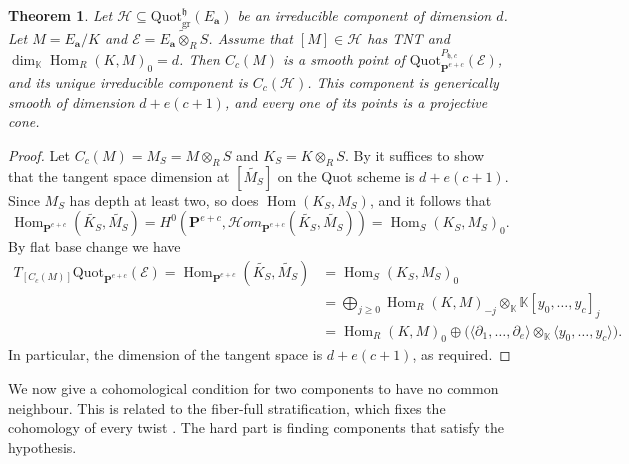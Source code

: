 \documentclass[leqno,11pt,a4paper]{amsart}
\newtheorem{thm}{Theorem}[section]
\theoremstyle{definition}
\numberwithin{equation}{section}
\newcommand{\kk}{\mathbb{K}}
\newcommand{\bfa}{\mathbf{a}}
\newcommand{\Quot}{\mathrm{Quot}}
\newcommand{\PP}{\mathbf{P}}
\newcommand{\mfh}{\mathfrak{h}}
\newcommand{\EE}{\mathscr{E}}
\newcommand{\HH}{\mathcal{H}}
\DeclareMathOperator{\Hom}{Hom}
\begin{document}
\begin{thm} \label{module_conet}
Let $\HH\subseteq\Quot^{\mfh}_{\mathrm{gr}}(E_\bfa)$ be an irreducible component of dimension $d$. 
Let $M = E_\bfa/K$ and $\EE = \widetilde{E_\bfa \otimes_R S}$.
Assume that $[M] \in\HH$ has TNT and $\dim_\kk\Hom_R(K,M)_0=d$. 
Then $C_c(M)$ is a smooth point of $\Quot^{P_{\mfh,c}}_{\PP^{e+c}}(\EE)$, and its unique irreducible component is $C_c(\HH)$. 
This component is generically smooth of dimension $d+e(c+1)$, and every one of its points is a projective cone.
\end{thm}

\begin{proof}
Let $C_c(M) = M_S = M \otimes_R S$ and $K_S = K \otimes_R S$.
By  it suffices to show that the tangent space dimension at $[\widetilde{M_S}]$ on the Quot scheme is $d+e(c+1)$.
Since $M_S$ has depth at least two, so does $\Hom(K_S,M_S)$, and it follows that 
$$
\Hom_{\PP^{e+c}}(\widetilde{K_S},\widetilde{M_S}) =  H^0(\PP^{e+c},\mathcal{H}om_{\PP^{e+c}}(\widetilde{K_S},\widetilde{M_S})) = \Hom_S(K_S,M_S)_0.
$$
By flat base change we have 
$$
\begin{aligned}
T_{[C_c(M)]}\Quot_{\PP^{e+c}}(\EE)  = \Hom_{\PP^{e+c}}(\widetilde{K_S},\widetilde{M_S}) & =\Hom_S(K_S,M_S)_0\\
&=\bigoplus_{j\geq0} \Hom_R(K,M)_{-j}
                 \otimes_\kk\kk[y_0,\ldots,y_c]_j\\
&=\Hom_R(K,M)_0 \oplus
  \bigl(\langle \partial_1,\ldots,\partial_e \rangle
                  \otimes_\kk \langle y_0,\ldots,y_c\rangle \bigr).
\end{aligned}
$$
In particular, the dimension of the tangent space is $d+ e(c+1)$, as required.
\end{proof}


We now give a cohomological condition for two components to have no common neighbour. 
This is related to the fiber-full stratification, which fixes the cohomology of every twist \cite{CidRuiz_Ramkumar__Fiber_full}. 
The hard part is finding components that satisfy the hypothesis.
\end{document}

